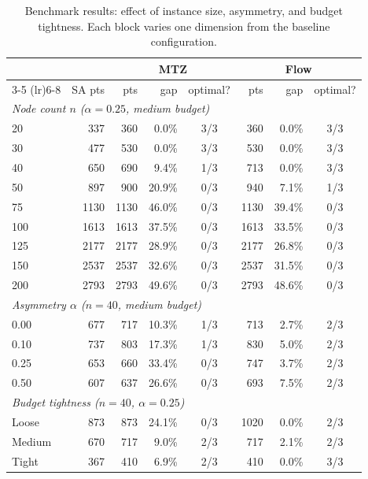 \documentclass[11pt,a4paper]{article}
\begin{document}
\begin{table}[H]
\centering
\caption{Benchmark results: effect of instance size, asymmetry, and budget tightness. Each block varies one dimension from the baseline configuration.}
\label{tab:bench_sweeps}
\begin{tabular}{lrrrcrrc}
\toprule
& & \multicolumn{3}{c}{\textbf{MTZ}} & \multicolumn{3}{c}{\textbf{Flow}} \\
\cmidrule(lr){3-5} \cmidrule(lr){6-8}
& SA pts & pts & gap & optimal? & pts & gap & optimal? \\
\midrule
\multicolumn{8}{l}{\textit{Node count $n$ ($\alpha = 0.25$, medium budget)}} \\
20  &  337 &  360 &  0.0\% & 3/3 &  360 &  0.0\% & 3/3 \\
30  &  477 &  530 &  0.0\% & 3/3 &  530 &  0.0\% & 3/3 \\
40  &  650 &  690 &  9.4\% & 1/3 &  713 &  0.0\% & 3/3 \\
50  &  897 &  900 & 20.9\% & 0/3 &  940 &  7.1\% & 1/3 \\
75  & 1130 & 1130 & 46.0\% & 0/3 & 1130 & 39.4\% & 0/3 \\
100 & 1613 & 1613 & 37.5\% & 0/3 & 1613 & 33.5\% & 0/3 \\
125 & 2177 & 2177 & 28.9\% & 0/3 & 2177 & 26.8\% & 0/3 \\
150 & 2537 & 2537 & 32.6\% & 0/3 & 2537 & 31.5\% & 0/3 \\
200 & 2793 & 2793 & 49.6\% & 0/3 & 2793 & 48.6\% & 0/3 \\
\midrule
\multicolumn{8}{l}{\textit{Asymmetry $\alpha$ ($n = 40$, medium budget)}} \\
0.00 &  677 &  717 & 10.3\% & 1/3 &  713 &  2.7\% & 2/3 \\
0.10 &  737 &  803 & 17.3\% & 1/3 &  830 &  5.0\% & 2/3 \\
0.25 &  653 &  660 & 33.4\% & 0/3 &  747 &  3.7\% & 2/3 \\
0.50 &  607 &  637 & 26.6\% & 0/3 &  693 &  7.5\% & 2/3 \\
\midrule
\multicolumn{8}{l}{\textit{Budget tightness ($n = 40$, $\alpha = 0.25$)}} \\
Loose  & 873  &  873 & 24.1\% & 0/3 & 1020 &  0.0\% & 2/3 \\
Medium & 670  &  717 &  9.0\% & 2/3 &  717 &  2.1\% & 2/3 \\
Tight  & 367  &  410 &  6.9\% & 2/3 &  410 &  0.0\% & 3/3 \\
\bottomrule
\end{tabular}
\end{table}
\end{document}

